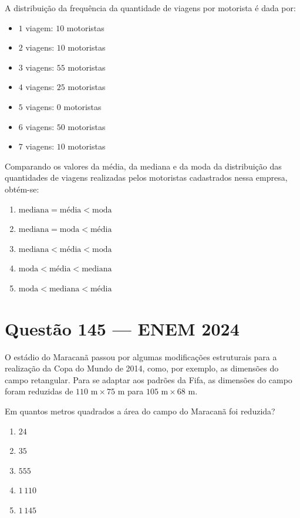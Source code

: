 \documentclass[11pt,a4paper]{article}
\begin{document}
A distribuição da frequência da quantidade de viagens por motorista é dada por:
\begin{itemize}
    \item $1$ viagem: $10$ motoristas
    \item $2$ viagens: $10$ motoristas
    \item $3$ viagens: $55$ motoristas
    \item $4$ viagens: $25$ motoristas
    \item $5$ viagens: $0$ motoristas
    \item $6$ viagens: $50$ motoristas
    \item $7$ viagens: $10$ motoristas
\end{itemize}

Comparando os valores da média, da mediana e da moda da distribuição das quantidades de viagens realizadas pelos motoristas cadastrados nessa empresa, obtém-se:

\begin{enumerate}[label=(\Alph*)]
    \item $\text{mediana} = \text{média} < \text{moda}$
    \item $\text{mediana} = \text{moda} < \text{média}$
    \item $\text{mediana} < \text{média} < \text{moda}$
    \item $\text{moda} < \text{média} < \text{mediana}$
    \item $\text{moda} < \text{mediana} < \text{média}$
\end{enumerate}


\section*{Questão 145 --- ENEM 2024}

O estádio do Maracanã passou por algumas modificações estruturais para a realização da Copa do Mundo de 2014, como, por exemplo, as dimensões do campo retangular. Para se adaptar aos padrões da Fifa, as dimensões do campo foram reduzidas de $110\text{ m} \times 75\text{ m}$ para $105\text{ m} \times 68\text{ m}$.

Em quantos metros quadrados a área do campo do Maracanã foi reduzida?

\begin{enumerate}[label=(\Alph*)]
    \item $24$
    \item $35$
    \item $555$
    \item $1\,110$
    \item $1\,145$
\end{enumerate}
\end{document}
